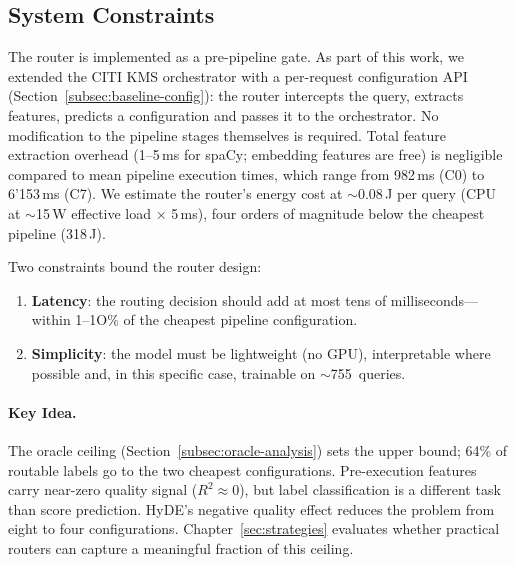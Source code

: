 \subsection{System Constraints}
\label{subsec:integration-constraints}

The router is implemented as a pre-pipeline gate.  As part of this work, we
extended the CITI KMS orchestrator with a per-request configuration API
(Section~\ref{subsec:baseline-config}): the router intercepts the query,
extracts features, predicts a configuration and passes it to the orchestrator.
No modification to the pipeline stages themselves is required.  Total feature
extraction overhead (1--5\,ms for spaCy; embedding features are free) is
negligible compared to mean pipeline execution times, which range from
982\,ms (C0) to 6{'}153\,ms (C7). We estimate the router's energy cost at
$\sim$0.08\,J per query (CPU at $\sim$15\,W effective load $\times$ 5\,ms),
four orders of magnitude below the cheapest pipeline (318\,J).

Two constraints bound the router design:
\begin{enumerate}
    \item \textbf{Latency}: the routing decision should add at most tens of
          milliseconds---within 1--1O\% of the cheapest pipeline
          configuration.
    \item \textbf{Simplicity}: the model must be lightweight (no GPU),
    interpretable where possible and, in this specific case, trainable on $\sim$755~queries. 
\end{enumerate}

\paragraph{Key Idea.}
The oracle ceiling (Section~\ref{subsec:oracle-analysis}) sets the upper bound;
64\% of routable labels go to the two cheapest configurations.
Pre-execution features carry near-zero quality signal ($R^2 \approx 0$),
but label classification is a different task than score prediction.
HyDE's negative quality effect reduces the problem from eight to four
configurations. Chapter~\ref{sec:strategies} evaluates whether practical
routers can capture a meaningful fraction of this ceiling.

